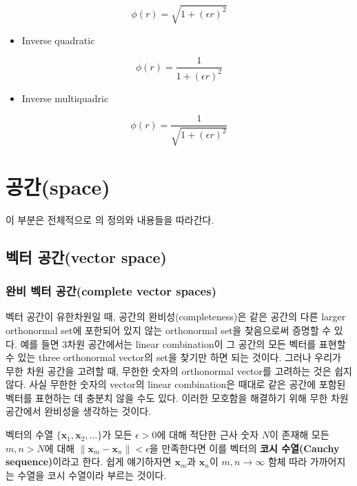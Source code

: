 \documentclass[b5paper,]{scrbook}
\providecommand{\tightlist}{%
  \setlength{\itemsep}{0pt}\setlength{\parskip}{0pt}}
\theoremstyle{plain}
\theoremstyle{definition}
\numberwithin{equation}{section}
\let\BeginKnitrBlock\begin \let\EndKnitrBlock\end
\begin{document}
\[\phi(r)=\sqrt{1+(\epsilon r)^{2}}\]

\begin{itemize}
\tightlist
\item
  Inverse quadratic
\end{itemize}

\[\phi(r)=\frac{1}{1+(\epsilon r)^{2}}\]

\begin{itemize}
\tightlist
\item
  Inverse multiquadric
\end{itemize}

\[\phi(r)=\frac{1}{\sqrt{1+(\epsilon r)^{2}}}\]

\section{공간(space)}\label{space}

이 부분은 전체적으로 \citep{Shima2016}의 정의와 내용들을 따라간다.

\subsection{벡터 공간(vector space)}\label{-vector-space}

\subsubsection{완비 벡터 공간(complete vector
spaces)}\label{--complete-vector-spaces}

벡터 공간이 유한차원일 때, 공간의 완비성(completeness)은 같은 공간의
다른 larger orthonormal set에 포한되어 있지 않는 orthonormal set을
찾음으로써 증명할 수 있다. 예를 들면 3차원 공간에서는 linear
combination이 그 공간의 모든 벡터를 표현할 수 있는 three orthonormal
vector의 set을 찾기만 하면 되는 것이다. 그러나 우리가 무한 차원 공간을
고려할 때, 무한한 숫자의 orthonormal vector를 고려하는 것은 쉽지 않다.
사실 무한한 숫자의 vector의 linear combination은 때대로 같은 공간에
포함된 벡터를 표현하는 데 충분치 않을 수도 있다. 이러한 모호함을
해결하기 위해 무한 차원 공간에서 완비성을 생각하는 것이다.

\BeginKnitrBlock{definition}[벡터의 Cauchy sequence]
\protect\hypertarget{def:unnamed-chunk-11}{}{\label{def:unnamed-chunk-11}
{} }벡터의 수열
\(\{ \mathbf{x}_{1},\mathbf{x}_{2},\ldots \}\)가 모든 \(\epsilon >0\)에
대해 적단한 근사 숫자 \(N\)이 존재해 모든 \(m,n > N\)에 대해
\(\| \mathbf{x}_{m} -\mathbf{x}_{n} \| < \epsilon\)을 만족한다면 이를
벡터의 \textbf{코시 수열(Cauchy sequence)}이라고 한다. 쉽게 얘기하자면
\(\mathbf{x}_{m}\)과 \(\mathbf{x}_{n}\)이 \(m,n \rightarrow \infty\)
함체 따라 가까어지는 수열을 코시 수열이라 부르는 것이다.
\EndKnitrBlock{definition}
\end{document}
